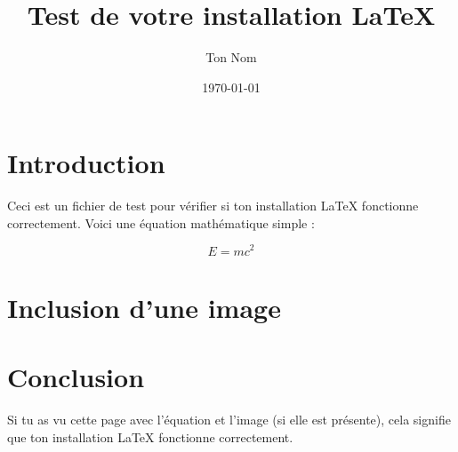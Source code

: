 \documentclass{article}
\title{Test de votre installation LaTeX}
\author{Ton Nom}
\date{\today}
\begin{document}
\maketitle

\section{Introduction}

Ceci est un fichier de test pour vérifier si ton installation LaTeX fonctionne correctement. Voici une équation mathématique simple :

\begin{equation}
    E = mc^2
\end{equation}

\section{Inclusion d'une image}


\section{Conclusion}

Si tu as vu cette page avec l'équation et l'image (si elle est présente), cela signifie que ton installation LaTeX fonctionne correctement.
\end{document}
